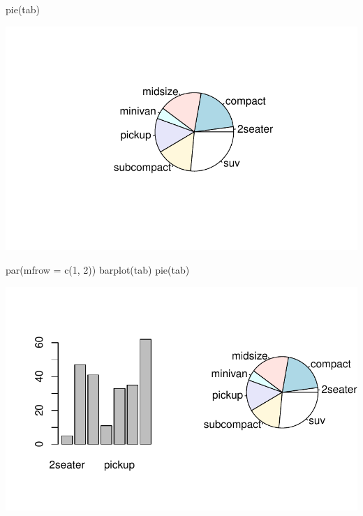 \documentclass[
  letterpaper,
  DIV=11,
  numbers=noendperiod]{scrreprt}
\newenvironment{Shaded}{\begin{snugshade}}{\end{snugshade}}
\newcommand{\AttributeTok}[1]{\textcolor[rgb]{0.40,0.45,0.13}{#1}}
\newcommand{\DecValTok}[1]{\textcolor[rgb]{0.68,0.00,0.00}{#1}}
\newcommand{\FunctionTok}[1]{\textcolor[rgb]{0.28,0.35,0.67}{#1}}
\newcommand{\NormalTok}[1]{\textcolor[rgb]{0.00,0.23,0.31}{#1}}
\begin{document}
\begin{Shaded}
\begin{Highlighting}[]
\FunctionTok{pie}\NormalTok{(tab)}
\end{Highlighting}
\end{Shaded}

\includegraphics{data_analysis_files/figure-pdf/unnamed-chunk-3-2.pdf}

\begin{Shaded}
\begin{Highlighting}[]
\FunctionTok{par}\NormalTok{(}\AttributeTok{mfrow =} \FunctionTok{c}\NormalTok{(}\DecValTok{1}\NormalTok{, }\DecValTok{2}\NormalTok{))}
\FunctionTok{barplot}\NormalTok{(tab)}
\FunctionTok{pie}\NormalTok{(tab)}
\end{Highlighting}
\end{Shaded}

\includegraphics{data_analysis_files/figure-pdf/unnamed-chunk-3-3.pdf}
\end{document}
